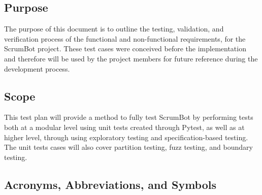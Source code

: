 \documentclass[12pt, titlepage]{article}
\begin{document}
\subsection{Purpose}
The purpose of this document is to outline the testing, validation, and verification process of the functional and non-functional requirements, for the ScrumBot project. These test cases were conceived before the implementation and therefore will be used by the project members for future reference during the development process.

\subsection{Scope}
This test plan will provide a method to fully test ScrumBot by performing tests both at a modular level using unit tests created through Pytest, as well as at higher level, through using exploratory testing and specification-based testing. The unit tests cases will also cover partition testing, fuzz testing, and boundary testing.

\subsection{Acronyms, Abbreviations, and Symbols}
	
\end{document}
